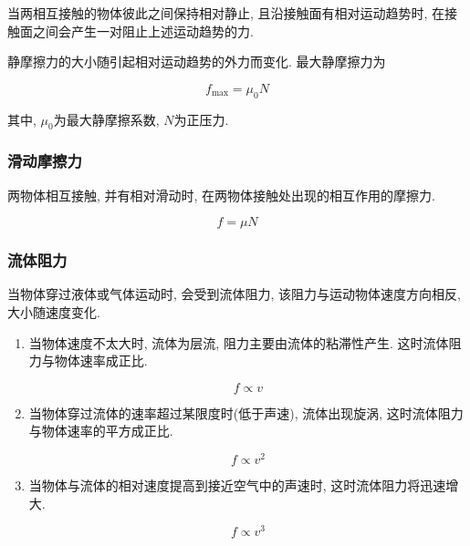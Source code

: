 当两相互接触的物体彼此之间保持相对静止, 且沿接触面有相对运动趋势时, 在接触面之间会产生一对阻止上述运动趋势的力. 

静摩擦力的大小随引起相对运动趋势的外力而变化. 最大静摩擦力为

\begin{equation}
	f_{\mathrm{max}} = \mu_0 N \label{C2-eq11}
\end{equation}

其中, $\mu_0$为最大静摩擦系数, $N$为正压力. 

\subsubsection{滑动摩擦力}

两物体相互接触, 并有相对滑动时, 在两物体接触处出现的相互作用的摩擦力. 

\begin{equation}
	f = \mu N \label{C2-eq12}
\end{equation}

\subsubsection{流体阻力}

当物体穿过液体或气体运动时, 会受到流体阻力, 该阻力与运动物体速度方向相反, 大小随速度变化. 

\begin{enumerate}
	
	\item 当物体速度不太大时, 流体为层流, 阻力主要由流体的粘滞性产生. 这时流体阻力与物体速率成正比. 
	
	\begin{equation}
		f \propto v \label{C2-eq13}
	\end{equation}
	
	\item 当物体穿过流体的速率超过某限度时(低于声速), 流体出现旋涡, 这时流体阻力与物体速率的平方成正比. 
	
	\begin{equation}
		f \propto v^2 \label{C2-eq14}
	\end{equation}
	
	\item 当物体与流体的相对速度提高到接近空气中的声速时, 这时流体阻力将迅速增大. 
	
	\begin{equation}
		f \propto v^3 \label{C2-eq15}
	\end{equation}
	
\end{enumerate}

